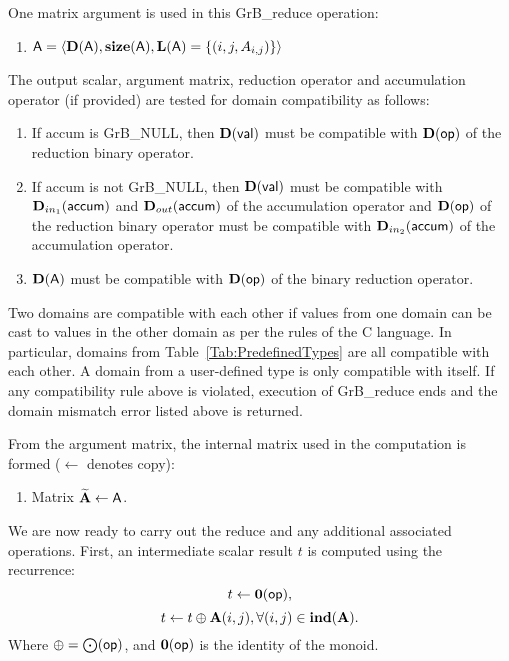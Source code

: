 One matrix argument is used in this {\sf GrB\_reduce} operation:
\begin{enumerate}
	\item ${\sf A} = \langle \bold{D}({\sf A}),\bold{size}({\sf A}),
    \bold{L}({\sf A}) = \{(i,j,A_{i,j}) \} \rangle$

\end{enumerate}

The output scalar, argument matrix, reduction operator and accumulation 
operator (if provided) are tested for domain compatibility as follows:
\begin{enumerate}

	\item If {\sf accum} is {\sf GrB\_NULL}, then $\bold{D}({\sf val})$ must be
    compatible with $\bold{D}({\sf op})$ of the reduction binary operator.

	\item If {\sf accum} is not {\sf GrB\_NULL}, then $\bold{D}({\sf val})$ must be
    compatible with $\mbox{$\mathbf{D}_{in_{1}}$}({\sf accum})$ and $\mbox{$\mathbf{D}_{out}$}({\sf accum})$ of the accumulation operator and 
    $\bold{D}({\sf op})$ of the reduction binary operator must be compatible with $\mbox{$\mathbf{D}_{in_{2}}$}({\sf accum})$ of the accumulation operator.

	\item $\bold{D}({\sf A})$ must be compatible with $\bold{D}({\sf op})$ of the binary reduction operator.
\end{enumerate}
Two domains are compatible with each other if values from one domain can be cast 
to values in the other domain as per the rules of the C language.
In particular, domains from Table~\ref{Tab:PredefinedTypes} are all compatible 
with each other. A domain from a user-defined type is only compatible with itself.
If any compatibility rule above is violated, execution of {\sf GrB\_reduce} ends and 
the domain mismatch error listed above is returned.

From the argument matrix, the internal matrix used in 
the computation is formed ($\leftarrow$ denotes copy):
\begin{enumerate}
	\item Matrix ${\bf \widetilde{A}} \leftarrow {\sf A}$.
\end{enumerate}

We are now ready to carry out the reduce and any additional 
associated operations.  
First, an intermediate scalar result $t$ is computed using the recurrence:
\[
	t \leftarrow \bold{0}({\sf op}),
\]
\[
	t \leftarrow t \oplus {\bf A}(i,j), \forall (i,j) \in \bold{ind}({\bf A}). 
\]
Where $\oplus = \bigodot({\sf op})$, and $\bold{0}({\sf op})$ is the identity of the monoid.

